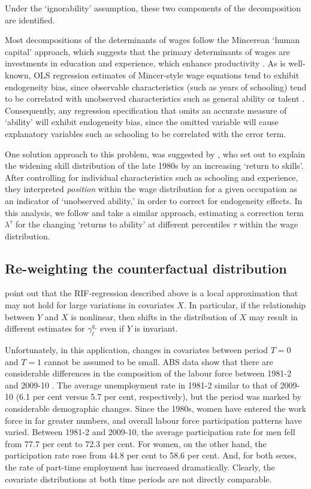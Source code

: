 Under the `ignorability' assumption, these two components of the decomposition are identified. 

Most decompositions of the determinants of wages follow the Mincerean `human capital' approach, which suggests that the primary determinants of wages are investments in education and experience, which enhance productivity \citep{Mincer1962}. As is well-known, OLS regression estimates of Mincer-style wage equations tend to exhibit endogeneity bias, since observable characteristics (such as years of schooling) tend to be correlated with unobserved characteristics such as general ability or talent \citep{Card1999}. Consequently, any regression specification that omits an accurate measure of `ability' will exhibit endogeneity bias, since the omitted variable will cause explanatory variables such as schooling to be correlated with the error term.

One solution approach to this problem, was suggested by \citet{Juhn1993}, who set out to explain the widening skill distribution of the late 1980s by an increasing `return to skills'. After controlling for individual characteristics such as schooling and experience, they interpreted {\em position} within the wage distribution for a given occupation as an indicator of `unobserved ability,' in order to correct for endogeneity effects. In this analysis, we follow \citet{Firpo2011} and take a similar approach, estimating a correction term $\lambda^\tau$ for the changing `returns to ability' at different percentiles $\tau$ within the wage distribution.

\subsection{Re-weighting the counterfactual distribution}\label{sec:reweight}

\citet[p.19]{Firpo2011} point out that the RIF-regression described above is a local approximation that may not hold for large variations in covariates $X$. In particular, if the relationship between $Y$ and $X$ is nonlinear, then shifts in the distribution of $X$ may result in different estimates for $\gamma^{q_\tau}_t$ even if $Y$ is invariant. 

Unfortunately, in this application, changes in covariates between period $T=0$ and $T=1$ cannot be assumed to be small. ABS data show that there are considerable differences in the composition of the labour force between 1981-2 and 2009-10 \citep{LFSApr2013}. The average unemployment rate in 1981-2 similar to that of 2009-10 (6.1 per cent versus 5.7 per cent, respectively), but the period was marked by considerable demographic changes. Since the 1980s, women have entered the work force in far greater numbers, and overall labour force participation patterns have varied. Between 1981-2 and 2009-10, the average participation rate for men fell from 77.7 per cent to 72.3 per cent. For women, on the other hand, the participation rate rose from 44.8 per cent to 58.6 per cent. And, for both sexes, the rate of part-time employment has increased dramatically. Clearly, the covariate distributions at both time periods are not directly comparable.

